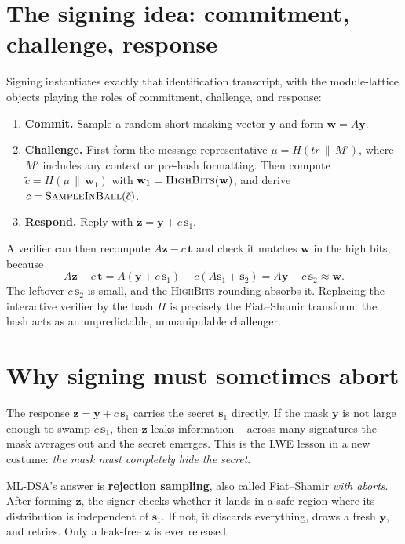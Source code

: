 \section{The signing idea: commitment, challenge, response}

Signing instantiates exactly that identification transcript, with the module-lattice objects playing the roles of commitment, challenge, and response:

\begin{enumerate}
  \item \textbf{Commit.} Sample a random short masking vector $\mathbf{y}$ and form $\mathbf{w} = A\mathbf{y}$.
  \item \textbf{Challenge.} First form the message representative $\mu=H(tr\,\|\,M')$, where $M'$ includes any context or pre-hash formatting. Then compute $\tilde c=H(\mu\,\|\,\mathbf{w}_1)$ with $\mathbf{w}_1=\textsc{HighBits}(\mathbf{w})$, and derive $c=\textsc{SampleInBall}(\tilde c)$.
  \item \textbf{Respond.} Reply with $\mathbf{z} = \mathbf{y} + c\,\mathbf{s}_1$.
\end{enumerate}

A verifier can then recompute $A\mathbf{z} - c\,\mathbf{t}$ and check it matches $\mathbf{w}$ in the high bits, because
\[
A\mathbf{z} - c\,\mathbf{t} = A(\mathbf{y}+c\,\mathbf{s}_1) - c(A\mathbf{s}_1+\mathbf{s}_2) = A\mathbf{y} - c\,\mathbf{s}_2 \approx \mathbf{w}.
\]
The leftover $c\,\mathbf{s}_2$ is small, and the \textsc{HighBits} rounding absorbs it. Replacing the interactive verifier by the hash $H$ is precisely the Fiat--Shamir transform: the hash acts as an unpredictable, unmanipulable challenger.

\section{Why signing must sometimes abort}

The response $\mathbf{z} = \mathbf{y} + c\,\mathbf{s}_1$ carries the secret $\mathbf{s}_1$ directly. If the mask $\mathbf{y}$ is not large enough to swamp $c\,\mathbf{s}_1$, then $\mathbf{z}$ leaks information -- across many signatures the mask averages out and the secret emerges. This is the LWE lesson in a new costume: \emph{the mask must completely hide the secret}.

ML-DSA's answer is \textbf{rejection sampling}, also called Fiat--Shamir \emph{with aborts}. After forming $\mathbf{z}$, the signer checks whether it lands in a safe region where its distribution is independent of $\mathbf{s}_1$. If not, it discards everything, draws a fresh $\mathbf{y}$, and retries. Only a leak-free $\mathbf{z}$ is ever released.

